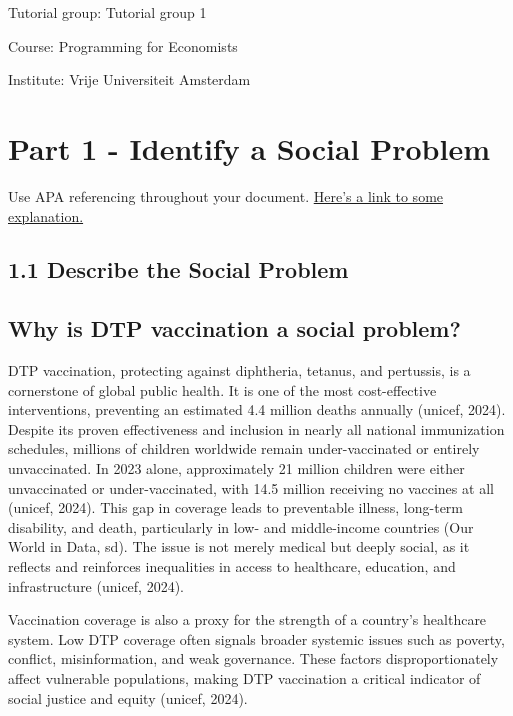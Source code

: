 \documentclass[
]{article}
\begin{document}
Tutorial group: Tutorial group 1

Course: Programming for Economists

Institute: Vrije Universiteit Amsterdam

\section{Part 1 - Identify a Social
Problem}\label{part-1---identify-a-social-problem}

Use APA referencing throughout your document.
\href{https://www.mendeley.com/guides/apa-citation-guide/}{Here's a link
to some explanation.}

\subsection{1.1 Describe the Social
Problem}\label{describe-the-social-problem}

\subsection{Why is DTP vaccination a social
problem?}\label{why-is-dtp-vaccination-a-social-problem}

DTP vaccination, protecting against diphtheria, tetanus, and pertussis,
is a cornerstone of global public health. It is one of the most
cost-effective interventions, preventing an estimated 4.4 million deaths
annually (unicef, 2024). Despite its proven effectiveness and inclusion
in nearly all national immunization schedules, millions of children
worldwide remain under-vaccinated or entirely unvaccinated. In 2023
alone, approximately 21 million children were either unvaccinated or
under-vaccinated, with 14.5 million receiving no vaccines at all
(unicef, 2024). This gap in coverage leads to preventable illness,
long-term disability, and death, particularly in low- and middle-income
countries (Our World in Data, sd). The issue is not merely medical but
deeply social, as it reflects and reinforces inequalities in access to
healthcare, education, and infrastructure (unicef, 2024).

Vaccination coverage is also a proxy for the strength of a country's
healthcare system. Low DTP coverage often signals broader systemic
issues such as poverty, conflict, misinformation, and weak governance.
These factors disproportionately affect vulnerable populations, making
DTP vaccination a critical indicator of social justice and equity
(unicef, 2024).
\end{document}
